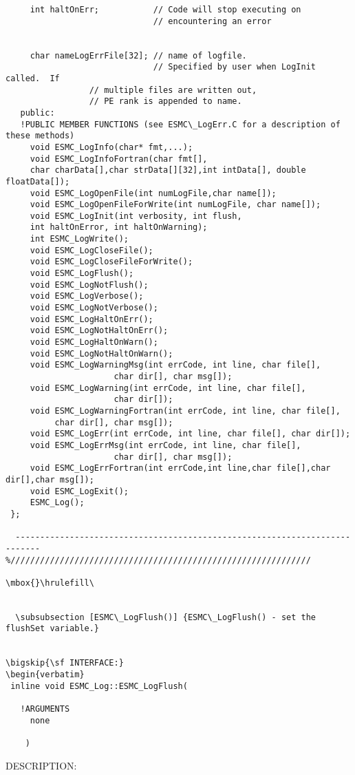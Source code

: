 \begin{verbatim}
     int haltOnErr;           // Code will stop executing on
                              // encountering an error
 
 
     char nameLogErrFile[32]; // name of logfile.
                              // Specified by user when LogInit called.  If
 			     // multiple files are written out,
 			     // PE rank is appended to name.
   public:
   !PUBLIC MEMBER FUNCTIONS (see ESMC\_LogErr.C for a description of these methods)
     void ESMC_LogInfo(char* fmt,...);   
     void ESMC_LogInfoFortran(char fmt[],
     char charData[],char strData[][32],int intData[], double floatData[]);
     void ESMC_LogOpenFile(int numLogFile,char name[]);
     void ESMC_LogOpenFileForWrite(int numLogFile, char name[]);
     void ESMC_LogInit(int verbosity, int flush,
 	 int haltOnError, int haltOnWarning);
     int ESMC_LogWrite();
     void ESMC_LogCloseFile();
     void ESMC_LogCloseFileForWrite();
     void ESMC_LogFlush();
     void ESMC_LogNotFlush();
     void ESMC_LogVerbose();
     void ESMC_LogNotVerbose();
     void ESMC_LogHaltOnErr();
     void ESMC_LogNotHaltOnErr();
     void ESMC_LogHaltOnWarn();
     void ESMC_LogNotHaltOnWarn();
     void ESMC_LogWarningMsg(int errCode, int line, char file[],
                      char dir[], char msg[]);
     void ESMC_LogWarning(int errCode, int line, char file[],
                      char dir[]);
     void ESMC_LogWarningFortran(int errCode, int line, char file[],
          char dir[], char msg[]);
     void ESMC_LogErr(int errCode, int line, char file[], char dir[]);
     void ESMC_LogErrMsg(int errCode, int line, char file[],
                      char dir[], char msg[]);
     void ESMC_LogErrFortran(int errCode,int line,char file[],char dir[],char msg[]);
     void ESMC_LogExit();
     ESMC_Log();
 };
  
  --------------------------------------------------------------------------- 
%/////////////////////////////////////////////////////////////
 
\mbox{}\hrulefill\ 
 

  \subsubsection [ESMC\_LogFlush()] {ESMC\_LogFlush() - set the flushSet variable.}


\bigskip{\sf INTERFACE:}
\begin{verbatim} 
 inline void ESMC_Log::ESMC_LogFlush(
 
   !ARGUMENTS
     none
 
    ) 
 \end{verbatim}
{\sf DESCRIPTION:\\ }

